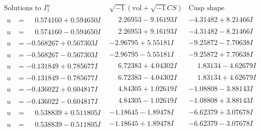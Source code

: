 \documentclass[1p]{elsarticle_modified}
\theoremstyle{definition}
\newcommand{\I}{\sqrt{-1}}
\begin{document}
$$\begin{array}{c|c|c}  
\text{Solutions to }I^u_{1}& \I (\text{vol} + \sqrt{-1}CS) & \text{Cusp shape}\\
 \hline 
\begin{aligned}
u &= \phantom{-}0.574160 + 0.594650 I\end{aligned}
 & \phantom{-}2.26953 - 9.16193 I & -4.31482 + 8.21466 I \\ \hline\begin{aligned}
u &= \phantom{-}0.574160 - 0.594650 I\end{aligned}
 & \phantom{-}2.26953 + 9.16193 I & -4.31482 - 8.21466 I \\ \hline\begin{aligned}
u &= -0.568267 + 0.567303 I\end{aligned}
 & -2.96795 + 5.55181 I & -9.25872 - 7.70638 I \\ \hline\begin{aligned}
u &= -0.568267 - 0.567303 I\end{aligned}
 & -2.96795 - 5.55181 I & -9.25872 + 7.70638 I \\ \hline\begin{aligned}
u &= -0.131849 + 0.785677 I\end{aligned}
 & \phantom{-}6.72383 + 4.04302 I & \phantom{-}1.83134 - 4.62679 I \\ \hline\begin{aligned}
u &= -0.131849 - 0.785677 I\end{aligned}
 & \phantom{-}6.72383 - 4.04302 I & \phantom{-}1.83134 + 4.62679 I \\ \hline\begin{aligned}
u &= -0.436022 + 0.604817 I\end{aligned}
 & \phantom{-}4.84305 + 1.02619 I & -1.08808 - 3.88143 I \\ \hline\begin{aligned}
u &= -0.436022 - 0.604817 I\end{aligned}
 & \phantom{-}4.84305 - 1.02619 I & -1.08808 + 3.88143 I \\ \hline\begin{aligned}
u &= \phantom{-}0.538839 + 0.511805 I\end{aligned}
 & -1.18645 - 1.89478 I & -6.62379 + 3.07678 I \\ \hline\begin{aligned}
u &= \phantom{-}0.538839 - 0.511805 I\end{aligned}
 & -1.18645 + 1.89478 I & -6.62379 - 3.07678 I \\ \hline\begin{aligned}

\end{aligned}
\end{array}$$
\end{document}
